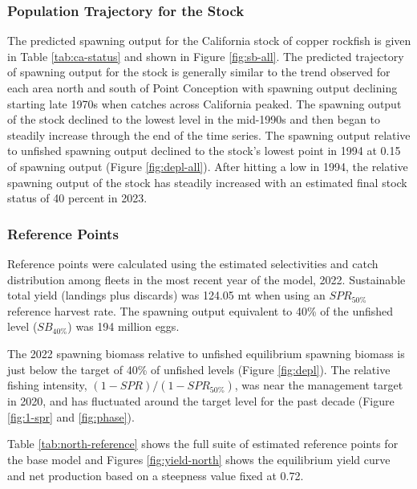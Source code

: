 \documentclass[11pt,
  english,
  letterpaper,
]{article}
\begin{document}
\hypertarget{population-trajectory-for-the-stock}{%
\subsubsection{Population Trajectory for the Stock}\label{population-trajectory-for-the-stock}}

The predicted spawning output for the California stock of copper rockfish is given in Table \ref{tab:ca-status} and shown in Figure \ref{fig:sb-all}. The predicted trajectory of spawning output for the stock is generally similar to the trend observed for each area north and south of Point Conception with spawning output declining starting late 1970s when catches across California peaked. The spawning output of the stock declined to the lowest level in the mid-1990s and then began to steadily increase through the end of the time series. The spawning output relative to unfished spawning output declined to the stock's lowest point in 1994 at 0.15 of spawning output (Figure \ref{fig:depl-all}). After hitting a low in 1994, the relative spawning output of the stock has steadily increased with an estimated final stock status of 40 percent in 2023.

\hypertarget{reference-points-1}{%
\subsubsection{Reference Points}\label{reference-points-1}}

Reference points were calculated using the estimated selectivities and catch distribution among fleets in the most recent year of the model, 2022. Sustainable total yield (landings plus discards) was 124.05 mt when using an \(SPR_{50\%}\) reference harvest rate. The spawning output equivalent to 40\% of the unfished level (\(SB_{40\%}\)) was 194 million eggs.

The 2022 spawning biomass relative to unfished equilibrium spawning biomass is just below the target of 40\% of unfished levels (Figure \ref{fig:depl}). The relative fishing intensity, \((1-SPR)/(1-SPR_{50\%})\), was near the management target in 2020, and has fluctuated around the target level for the past decade (Figure \ref{fig:1-spr} and \ref{fig:phase}).

Table \ref{tab:north-reference} shows the full suite of estimated reference points for the base model and Figures \ref{fig:yield-north} shows the equilibrium yield curve and net production based on a steepness value fixed at 0.72.
\end{document}
